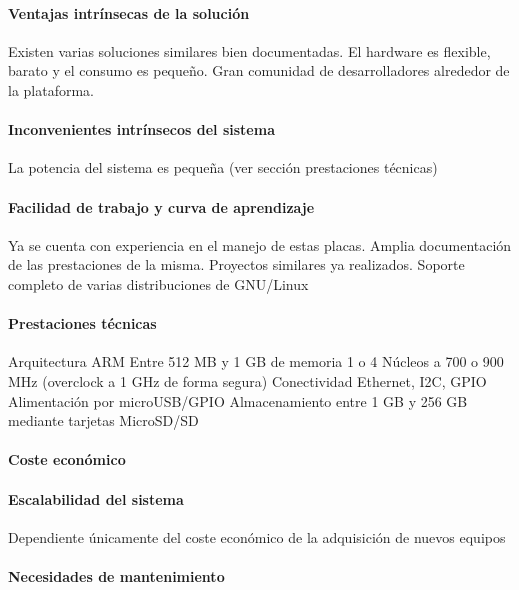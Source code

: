 \paragraph{Ventajas intrínsecas de la solución}
Existen varias soluciones similares bien documentadas.
El hardware es flexible, barato y el consumo es pequeño.
Gran comunidad de desarrolladores alrededor de la plataforma.

\paragraph{Inconvenientes intrínsecos del sistema}

La potencia del sistema es pequeña (ver sección prestaciones técnicas)

\paragraph{Facilidad de trabajo y curva de aprendizaje}

Ya se cuenta con experiencia en el manejo de estas placas.
Amplia documentación de las prestaciones de la misma.
Proyectos similares ya realizados.
Soporte completo de varias distribuciones de GNU/Linux

\paragraph{Prestaciones técnicas}

Arquitectura ARM
Entre 512 MB y 1 GB de memoria
1 o 4 Núcleos a 700 o 900 MHz (overclock a 1 GHz de forma segura)
Conectividad Ethernet, I2C, GPIO
Alimentación por microUSB/GPIO
Almacenamiento entre 1 GB y 256 GB mediante tarjetas MicroSD/SD

\paragraph{Coste económico}

\paragraph{Escalabilidad del sistema}

Dependiente únicamente del coste económico de la adquisición de nuevos equipos

\paragraph{Necesidades de mantenimiento}

